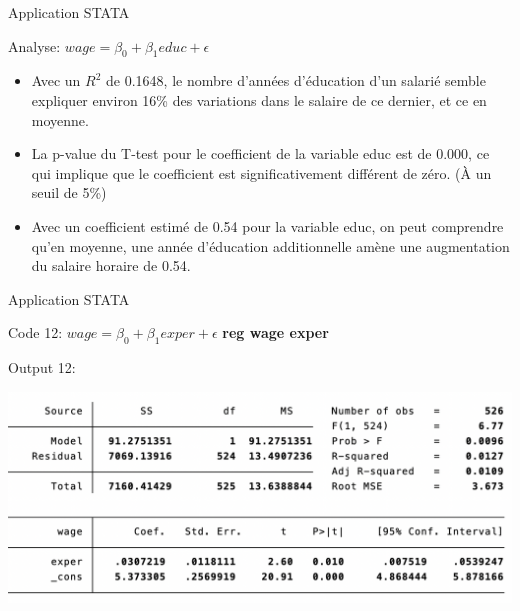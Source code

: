 \documentclass{beamer}
\begin{document}
\begin{frame}{Application STATA}
\begin{block}{Analyse: $wage = \beta_0 + \beta_1 educ  + \epsilon$}
\begin{itemize}
\item Avec un $R^2$ de 0.1648, le nombre d’années d’éducation d'un salarié semble expliquer environ 16\% des variations dans le salaire de ce dernier, et ce en moyenne.
\item La p-value du T-test pour le coefficient de la variable educ est de 0.000, ce qui implique que le coefficient est significativement différent de zéro. (À un seuil de 5\%)
\item Avec un coefficient estimé de 0.54 pour la variable educ, on peut comprendre qu’en moyenne, une année d’éducation additionnelle amène une augmentation du salaire horaire de 0.54.
\end{itemize}
\end{block}
\end{frame}





\begin{frame}{Application STATA}
\begin{block}{Code 12: $wage = \beta_0 + \beta_1 exper  + \epsilon$}
\textbf{reg wage exper}
\end{block}

\begin{block}{Output 12:}
\begin{center}
\includegraphics[scale=.5]{REG2.png}
\end{center}
\end{block}
\end{frame}
\end{document}
